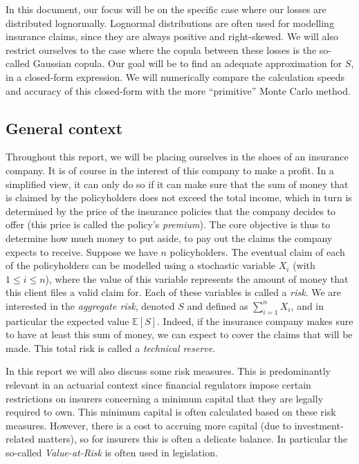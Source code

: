 \documentclass{article}
\begin{document}
In this document, our focus will be on the specific case where our losses are distributed lognormally. Lognormal distributions are often used for modelling insurance claims, since they are always positive and right-skewed. We will also restrict ourselves to the case where the copula between these losses is the so-called Gaussian copula. Our goal will be to find an adequate approximation for $S$, in a closed-form expression. We will numerically compare the calculation speeds and accuracy of this closed-form with the more ``primitive'' Monte Carlo method.

\subsection{General context}
Throughout this report, we will be placing ourselves in the shoes of an insurance company. It is of course in the interest of this company to make a profit. In a simplified view, it can only do so if it can make sure that the sum of money that is claimed by the policyholders does not exceed the total income, which in turn is determined by the price of the insurance policies that the company decides to offer (this price is called the policy's \textit{premium}). The core objective is thus to determine how much money to put aside, to pay out the claims the company expects to receive. Suppose we have $n$ policyholders. The eventual claim of each of the policyholders can be modelled using a stochastic variable $X_i$ (with $1 \leq i \leq n$), where the value of this variable represents the amount of money that this client files a valid claim for. Each of these variables is called a \textit{risk}. We are interested in the \textit{aggregate risk}, denoted $S$ and defined as $\sum_{i=1}^n X_i$, and in particular the expected value $\mathbb{E}[S]$. Indeed, if the insurance company makes sure to have at least this sum of money, we can expect to cover the claims that will be made. This total risk is called a \textit{technical reserve}.

In this report we will also discuss some risk measures. This is predominantly relevant in an actuarial context since financial regulators impose certain restrictions on insurers concerning a minimum capital that they are legally required to own. This minimum capital is often calculated based on these risk measures. However, there is a cost to accruing more capital (due to investment-related matters), so for insurers this is often a delicate balance. In particular the so-called \textit{Value-at-Risk} is often used in legislation.
\end{document}
